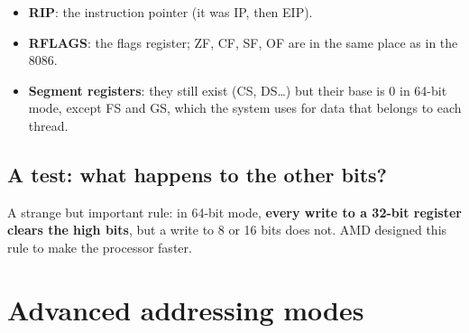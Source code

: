 \begin{itemize}
    \item \textbf{RIP}: the instruction pointer (it was IP, then EIP).
    \item \textbf{RFLAGS}: the flags register; ZF, CF, SF, OF are in the same place as in the 8086.
    \item \textbf{Segment registers}: they still exist (CS, DS\dots) but their base is 0 in 64-bit mode, except FS and GS,
          which the system uses for data that belongs to each thread.
\end{itemize}

\subsection{A test: what happens to the other bits?}

\begin{sharh}
\end{sharh}

\begin{intabih}
    A strange but important rule: in 64-bit mode, \textbf{every write to a 32-bit register clears the high bits}, but a
    write to 8 or 16 bits does not. AMD designed this rule to make the processor faster.
\end{intabih}

\section{Advanced addressing modes}

